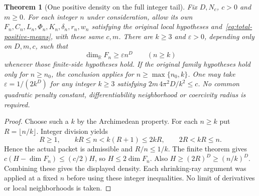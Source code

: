 \documentclass[11pt]{article}
\newtheorem{theorem}{Theorem}[section]
\newcommand{\R}{\mathbb R}
\begin{document}
\begin{theorem}[One positive density on the full integer tail]\label{thm:volume-full-tail}
Fix $D,N_c$, $c>0$ and $m\geq0$. For each integer $n$ under consideration,
allow its own $F_n,C_n,L_n,\Phi_n,K_n,\delta_n,r_n,w_n$ satisfying the
original local hypotheses and~\eqref{eq:total-positive-means}, with these
same $c,m$. There are $k\geq3$ and $\varepsilon>0$, depending only on
$D,m,c$, such that
\[
 \dim_{\R}F_n\geq\varepsilon n^D\qquad(n\geq k)
\]
whenever those finite-side hypotheses hold. If the original family hypotheses hold only for $n\geq n_0$, the conclusion applies for $n\geq\max\{n_0,k\}$. One may take
$\varepsilon=1/(2k^D)$ for any integer $k\geq3$ satisfying
$2m\,4\pi^2D/k^2\leq c$. No common quadratic penalty constant,
differentiability neighborhood or coercivity radius is required.
\end{theorem}
\begin{proof}
Choose such a $k$ by the Archimedean property. For each $n\geq k$ put
$R=\lfloor n/k\rfloor$. Integer division yields
\[
 R\geq1,\qquad kR\leq n<k(R+1)\leq2kR,\qquad2R<kR\leq n.
\]
Hence the actual packet is admissible and $R/n\leq1/k$. The finite theorem
gives $c(H-\dim F_n)\leq(c/2)H$, so $H\leq2\dim F_n$. Also
$H\geq(2R)^D\geq(n/k)^D$. Combining these gives the displayed density.
Each shrinking-ray argument was applied at a fixed $n$ before using these
integer inequalities. No limit of derivatives or local neighborhoods is taken.
\end{proof}
\end{document}
